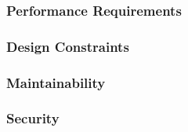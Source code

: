 \subsubsection{Performance Requirements}

\subsubsection{Design Constraints}

\subsubsection{Maintainability}

\subsubsection{Security}
